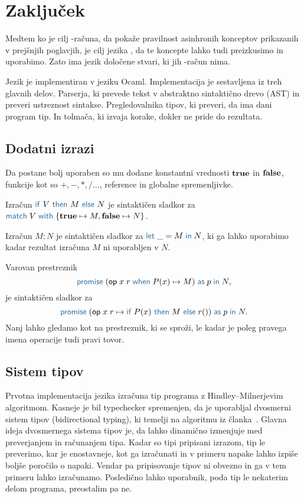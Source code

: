 \section{Zaključek}\label{sec:konec}

Medtem ko je cilj \lae-računa, da pokaže pravilnost asinhronih konceptov prikazanih v prejšnjih poglavjih, je cilj jezika \aeff{}, da te koncepte lahko tudi preizkusimo in uporabimo. Zato ima jezik \aeff{} določene stvari, ki jih \lae-račun nima.

Jezik \aeff{} je implementiran v jeziku Ocaml. Implementacija je sestavljena iz treh glavnih delov.
Parserja, ki prevede tekst v abstraktno sintaktično drevo (AST) in preveri ustreznost sintakse.  
Pregledovalnika tipov, ki preveri, da ima dani program tip.
In tolmača, ki izvaja korake, dokler ne pride do rezultata.

\subsection{Dodatni izrazi}

Da \aeff{} postane bolj uporaben so mu dodane konstantni vrednosti $\mathbf{true}$ in $\mathbf{false}$, funkcije kot so $+, -, *, / ...$, reference in globalne spremenljivke.

Izračun $\tmkw{if}\ V\ \tmkw{then}\ M\ \tmkw{else}\ N$ je sintaktičen sladkor za $\tmmatch{V}{\true \mapsto M, \false \mapsto N}$.

Izračun $M;N$ je sintaktičen sladkor za $\tmlet{\_}{M}{N}$, ki ga lahko uporabimo kadar rezultat izračuna $M$ ni uporabljen v $N$.

Varovan prestreznik $$\tmwithrecgu{op}{x}{r}{P(x)}{M}{p}{N},$$ je sintaktičen sladkor za $$\tmwithrec{op}{x}{r}{\tmif{P(x)}{M}{r()}}{p}{N}.$$
Nanj lahko gledamo kot na prestreznik, ki se sproži, le kadar je poleg pravega imena operacije tudi pravi tovor.


\subsection{Sistem tipov}\label{sec:tipi}

Prvotna implementacija jezika \aeff{} izračuna tip programa z Hindley–Milnerjevim algoritmom. 
Kasneje je bil typechecker spremenjen, da je uporabljal dvosmerni sistem tipov (bidirectional typing), ki temelji na algoritmu iz članka~\cite{bidirectional}.
Glavna ideja dvosmernega sistema tipov je, da lahko dinamično izmenjuje med preverjanjem in računanjem tipa. Kadar so tipi pripisani izrazom, tip le preverimo, kar je enostavneje, kot ga izračunati in v primeru napake lahko izpiše boljše poročilo o napaki. Vendar pa pripisovanje tipov ni obvezno in ga v tem primeru lahko izračunamo. Posledično lahko uporabnik, poda tip le nekaterim delom programa, preostalim pa ne.

